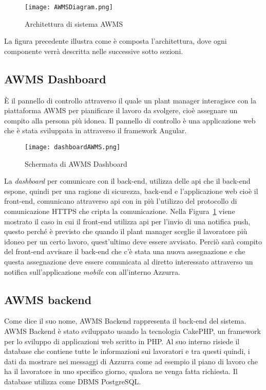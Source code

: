 \begin{figure}[h]
 	\begin{center}
 		\texttt{[image: AWMSDiagram.png]}
 		\caption{Architettura di sistema AWMS}\label{fig:arch}
 	\end{center}
 \end{figure}
La figura precedente illustra come è composta l'\gls{architettura}\ap{[g]}, dove ogni componente verrà descritta nelle successive sotto sezioni.
\begin{trivlist}
	\item \subsection{AWMS Dashboard}
	È il pannello di controllo attraverso il quale un \gls{plant manager}\ap{[g]} interagisce con la piattaforma \gls{AWMS} per pianificare il lavoro da svolgere, cioè assegnare un compito alla persona più idonea. Il pannello di controllo è una applicazione web che è stata sviluppata in attraverso il \gls{framework}\ap{[g]} Angular.
	\begin{figure}[h] 
		\begin{center}
			\texttt{[image: dashboardAWMS.png]}
			\caption{Schermata di AWMS Dashboard}
		\end{center}
	\end{figure}
	 	La \emph{dashboard} per comunicare con il back-end, utilizza delle \gls{api}\ap{[g]} che il back-end espone, quindi per una ragione di sicurezza, back-end e l'applicazione web cioè il front-end, comunicano attraverso \gls{api}\ap{[g]} con in più l'utilizzo del protocollo di comunicazione HTTPS che cripta la comunicazione. Nella Figura~\ref{fig:arch} viene mostrato il caso in cui il front-end utilizza \gls{api}\ap{[g]} per l'invio di una \gls{notifica push}\ap{[g]}, questo perché è previsto che quando il \gls{plant manager}\ap{[g]} sceglie il lavoratore più idoneo per un certo lavoro, quest'ultimo deve essere avvisato. Perciò sarà compito del front-end avvisare il back-end che c'è stata una nuova assegnazione e che questa assegnazione deve essere comunicata al diretto interessato attraverso un notifica sull'applicazione \emph{mobile} con all'interno Azzurra.
	\item \subsection{AWMS backend}
	Come dice il suo nome, AWMS Backend rappresenta il back-end del sistema. AWMS Backend è stato sviluppato usando la tecnologia CakePHP, un \gls{framework}\ap{[g]} per lo sviluppo di applicazioni web scritto in PHP. Al suo interno risiede il database che contiene tutte le informazioni sui lavoratori e tra questi quindi, i dati da mostrare nei messaggi di Azzurra come ad esempio il piano di lavoro che ha il lavoratore in uno specifico giorno, qualora ne venga fatta richiesta. Il database utilizza come DBMS PostgreSQL. \\

\end{trivlist}
